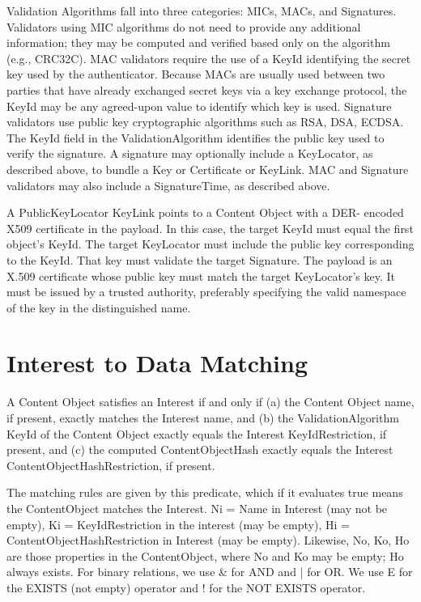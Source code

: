 \documentclass[12pt]{report}
\begin{document}
Validation Algorithms fall into three categories: MICs, MACs, and
Signatures.  Validators using MIC algorithms do not need to provide
any additional information; they may be computed and verified based
only on the algorithm (e.g., CRC32C).  MAC validators require the use
of a KeyId identifying the secret key used by the authenticator.
Because MACs are usually used between two parties that have already
exchanged secret keys via a key exchange protocol, the KeyId may be
any agreed-upon value to identify which key is used.  Signature
validators use public key cryptographic algorithms such as RSA, DSA,
ECDSA.  The KeyId field in the ValidationAlgorithm identifies the
public key used to verify the signature.  A signature may optionally
include a KeyLocator, as described above, to bundle a Key or
Certificate or KeyLink.  MAC and Signature validators may also
include a SignatureTime, as described above.

A PublicKeyLocator KeyLink points to a Content Object with a DER-
encoded X509 certificate in the payload.  In this case, the target
KeyId must equal the first object's KeyId.  The target KeyLocator
must include the public key corresponding to the KeyId.  That key
must validate the target Signature.  The payload is an X.509
certificate whose public key must match the target KeyLocator's key.
It must be issued by a trusted authority, preferably specifying the
valid namespace of the key in the distinguished name.

\section{Interest to Data Matching}
A Content Object satisfies an Interest if and only if (a) the Content
Object name, if present, exactly matches the Interest name, and (b)
the ValidationAlgorithm KeyId of the Content Object exactly equals
the Interest KeyIdRestriction, if present, and (c) the computed
ContentObjectHash exactly equals the Interest
ContentObjectHashRestriction, if present.

The matching rules are given by this predicate, which if it evaluates
true means the ContentObject matches the Interest.  Ni = Name in
Interest (may not be empty), Ki = KeyIdRestriction in the interest
(may be empty), Hi = ContentObjectHashRestriction in Interest (may be
empty).  Likewise, No, Ko, Ho are those properties in the
ContentObject, where No and Ko may be empty; Ho always exists.  For
binary relations, we use \& for AND and | for OR.  We use E for the
EXISTS (not empty) operator and ! for the NOT EXISTS operator.
\end{document}
